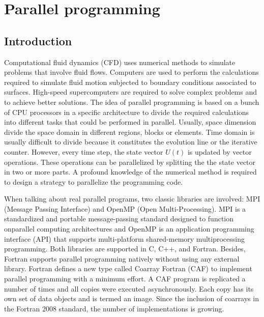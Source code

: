 
 


\chapter{Parallel programming} 


\vspace{-1cm} 
\section{Introduction}
\vspace{-0.2cm} 
Computational fluid dynamics (CFD) 
uses numerical methods to simulate problems that involve fluid flows. 
Computers are used to perform the calculations required to simulate 
fluid motion subjected to boundary conditions associated to surfaces.  
High-speed supercomputers are  required to solve complex problems
and to achieve better solutions.
The idea of parallel programming is based on a bunch of CPU processors in a specific architecture 
to divide the required calculations into different tasks that could be performed in parallel.
Usually, space dimension divide the space domain in different regions, blocks or elements.
Time domain is usually difficult to divide because it constitutes the evolution line 
or the iterative counter. 
However, every time step, the  state vector $ U(t) $ is updated 
by vector operations. These operations  can be parallelized by splitting the the state 
vector in two or more parts. A profound knowledge of the numerical method is required to 
design a strategy to parallelize the programming code.
  
When talking about real parallel programs, two classic libraries are involved: MPI (Message Passing Interface)
and OpenMP (Open Multi-Processing).
MPI is a standardized and portable message-passing standard designed to function onparallel computing architectures
and OpenMP is an application programming interface (API) 
that supports multi-platform shared-memory multiprocessing programming. 
Both libraries are supported  in C, C++, and Fortran.
Besides, Fortran supports parallel programming natively without using any external library. 
Fortran defines a new type called Coarray Fortran (CAF) to implement parallel programming with a minimum effort. 
A CAF program is replicated a number of times and all copies were executed asynchronously. 
Each copy has its own set of data objects and is termed an image. 
Since the inclusion of coarrays in the Fortran 2008 standard, the number of implementations is growing.


